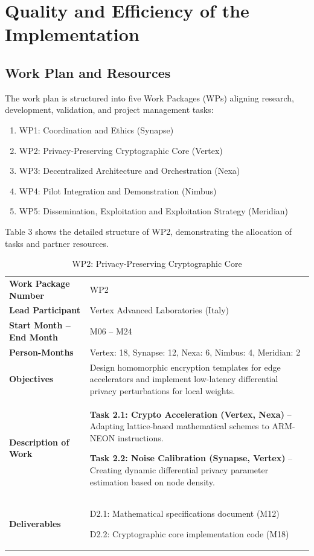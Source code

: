 \section{Quality and Efficiency of the Implementation}
\label{sec:implementation}

\subsection{Work Plan and Resources}
\label{sec:workplan}

The work plan is structured into five Work Packages (WPs) aligning research, development, validation, and project management tasks:
\begin{enumerate}[label=\lbrack WP\arabic*\rbrack]
    \item WP1: Coordination and Ethics (Synapse)
    \item WP2: Privacy-Preserving Cryptographic Core (Vertex)
    \item WP3: Decentralized Architecture and Orchestration (Nexa)
    \item WP4: Pilot Integration and Demonstration (Nimbus)
    \item WP5: Dissemination, Exploitation and Exploitation Strategy (Meridian)
\end{enumerate}

Table 3 shows the detailed structure of WP2, demonstrating the allocation of tasks and partner resources.

\begin{table}[h]
\caption{WP2: Privacy-Preserving Cryptographic Core}
\label{tab:wp2}
\begin{tabularx}{\textwidth}{p{3.5cm} X}
\toprule
\textbf{Work Package Number} & WP2 \\
\textbf{Lead Participant} & Vertex Advanced Laboratories (Italy) \\
\textbf{Start Month -- End Month} & M06 -- M24 \\
\textbf{Person-Months} & Vertex: 18, Synapse: 12, Nexa: 6, Nimbus: 4, Meridian: 2 \\
\midrule
\textbf{Objectives} & Design homomorphic encryption templates for edge accelerators and implement low-latency differential privacy perturbations for local weights. \\
\midrule
\textbf{Description of Work} & \textbf{Task 2.1: Crypto Acceleration (Vertex, Nexa)} -- Adapting lattice-based mathematical schemes to ARM-NEON instructions. \par \textbf{Task 2.2: Noise Calibration (Synapse, Vertex)} -- Creating dynamic differential privacy parameter estimation based on node density. \\
\midrule
\textbf{Deliverables} & D2.1: Mathematical specifications document (M12) \par D2.2: Cryptographic core implementation code (M18) \\
\bottomrule
\end{tabularx}
\end{table}

